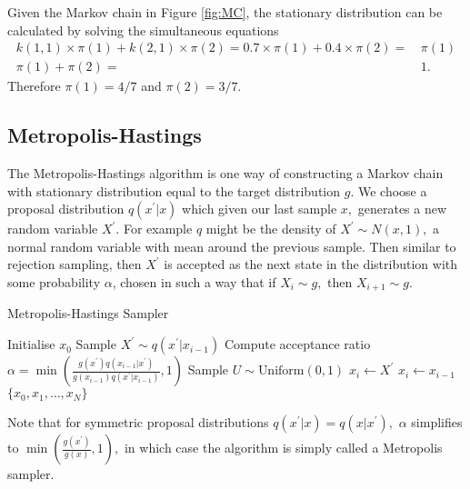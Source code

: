 \begin{example}
    Given the Markov chain in Figure \ref{fig:MC}, the stationary distribution
    can be calculated by solving the simultaneous equations
    \begin{align*}
        k(1, 1) \times \pi(1)
        + k(2, 1) \times \pi(2) = 0.7 \times \pi(1)
        + 0.4 \times \pi(2) = & \, \pi(1) \\
        \pi(1) + \pi(2) =     & \, 1.
    \end{align*}
    Therefore $\pi(1) = 4/7$ and $\pi(2) = 3/7.$
\end{example}

\subsection*{Metropolis-Hastings}

The Metropolis-Hastings algorithm is one way of constructing a Markov
chain with stationary distribution equal to the target distribution $g.$
We choose a proposal distribution $q(x^\prime| x)$ which given our last sample
$x,$ generates a new random
variable $X^\prime.$ For example $q$ might be the density of
$X^\prime \sim N(x, 1),$ a normal random variable with mean
around the previous sample. Then similar to rejection sampling, then $X^\prime$
is accepted as the next state in the distribution with some probability
$\alpha$, chosen in such a way that if
$X_i \sim g,$ then $X_{i + 1}\sim g.$

\begin{algorithm}[htbp]
    \caption{Metropolis-Hastings Sampler}
    \label{alg:MH}
    \begin{algorithmic}[1]
        \State Initialise $x_0$
        \State Sample $X^\prime \sim q(x^\prime|x_{i - 1})$
        \State Compute acceptance ratio
        $\alpha
            = \min\left(
            \frac{
            g(x^\prime) q(x_{i - 1}|x^\prime)
            }{
            g(x_{i - 1}) q(x^\prime|x_{i - 1})
            },
            1
            \right)$
        \State Sample $U \sim \text{Uniform}(0, 1)$
        \State $x_i \gets X^\prime$
        \Else
        \State $x_i \gets x_{i-1}$
        \EndIf
        \EndFor
        \State \Return $\{x_0, x_1, \dots, x_N\}$
    \end{algorithmic}
\end{algorithm}

Note that for symmetric proposal distributions $q(x^\prime|x) = q(x|x^\prime),$
$\alpha$ simplifies to $\min\left(\frac{g(x^\prime)}{g(x)}, 1\right),$ in
which case the algorithm is simply called a Metropolis sampler.

